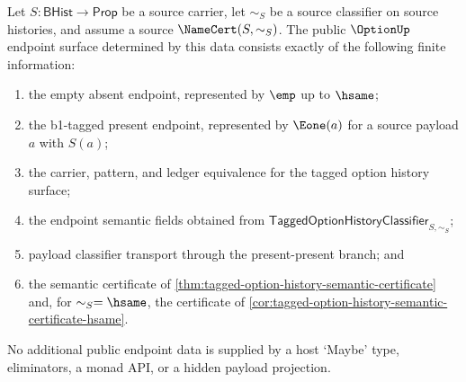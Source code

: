 \begin{theorem}
\label{thm:option-public-endpoint-semantic-scope}
Let $S:\mathsf{BHist}\to\mathsf{Prop}$ be a source carrier, let $\sim_S$ be a
source classifier on source histories, and assume a source
$\NameCert(S,\sim_S)$. The public $\OptionUp$ endpoint surface determined by
this data consists exactly of the following finite information:
\begin{enumerate}
  \item the empty absent endpoint, represented by $\emp$ up to $\hsame$;
  \item the b1-tagged present endpoint, represented by $\Eone(a)$ for a source
  payload $a$ with $S(a)$;
  \item the carrier, pattern, and ledger equivalence for the tagged option
  history surface;
  \item the endpoint semantic fields obtained from
  $\mathsf{TaggedOptionHistoryClassifier}_{S,\sim_S}$;
  \item payload classifier transport through the present-present branch; and
  \item the semantic certificate of
  \autoref{thm:tagged-option-history-semantic-certificate} and, for
  $\sim_S=\hsame$, the certificate of
  \autoref{cor:tagged-option-history-semantic-certificate-hsame}.
\end{enumerate}
No additional public endpoint data is supplied by a host `Maybe' type,
eliminators, a monad API, or a hidden payload projection.
\end{theorem}
